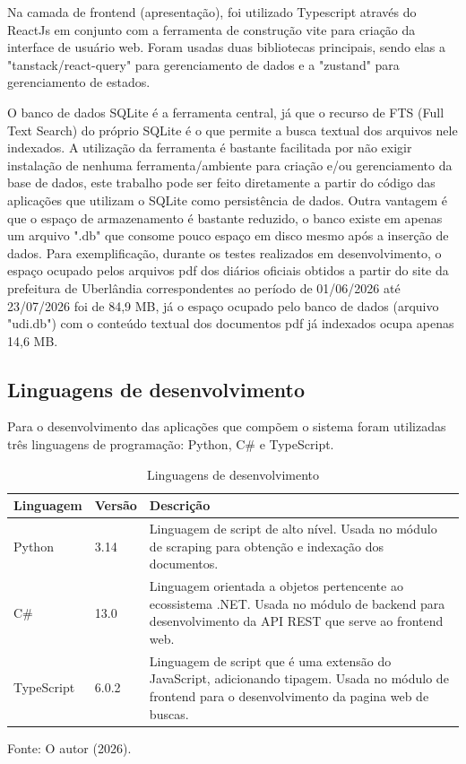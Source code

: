 Na camada de frontend (apresentação), foi utilizado Typescript através do ReactJs em conjunto com a ferramenta de construção vite para criação da interface de usuário web. Foram usadas duas bibliotecas principais, sendo elas a "tanstack/react-query" para gerenciamento de dados e a "zustand" para gerenciamento de estados.

O banco de dados SQLite é a ferramenta central, já que o recurso de FTS (Full Text Search) do próprio SQLite é o que permite a busca textual dos arquivos nele indexados. A utilização da ferramenta é bastante facilitada por não exigir instalação de nenhuma ferramenta/ambiente para criação e/ou gerenciamento da base de dados, este trabalho pode ser feito diretamente a partir do código das aplicações que utilizam o SQLite como persistência de dados. Outra vantagem é que o espaço de armazenamento é bastante reduzido, o banco existe em apenas um arquivo ".db" que consome pouco espaço em disco mesmo após a inserção de dados. Para exemplificação, durante os testes realizados em desenvolvimento, o espaço ocupado pelos arquivos pdf dos diários oficiais obtidos a partir do site da prefeitura de Uberlândia correspondentes ao período de 01/06/2026 até 23/07/2026 foi de 84,9 MB, já o espaço ocupado pelo banco de dados (arquivo "udi.db") com o conteúdo textual dos documentos pdf já indexados ocupa apenas 14,6 MB.




\subsection{Linguagens de desenvolvimento}
Para o desenvolvimento das aplicações que compõem o sistema foram utilizadas três linguagens de programação: Python, C\# e TypeScript.

\begin{table}[h]
    \centering
    \caption{Linguagens de desenvolvimento}
    \label{tab:tabela_linguagens_dsv}
    \begin{tabularx}{\textwidth}{l l X}
        \toprule
        Linguagem & Versão & Descrição \\
        \midrule
        Python & 3.14 &Linguagem de script de alto nível. Usada no módulo de scraping para obtenção e indexação dos documentos. \\
        C\# & 13.0 &Linguagem orientada a objetos pertencente ao ecossistema .NET. Usada no módulo de backend para desenvolvimento da API REST que serve ao frontend web. \\
        TypeScript & 6.0.2 &Linguagem de script que é uma extensão do JavaScript, adicionando tipagem. Usada no módulo de frontend para o desenvolvimento da pagina web de buscas. \\
        \bottomrule
    \end{tabularx}
\end{table}{\footnotesize Fonte: O autor (2026).}

